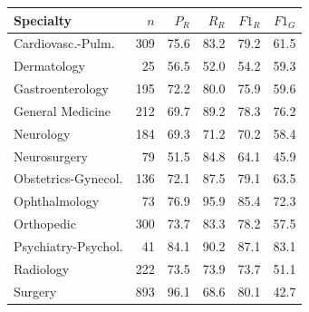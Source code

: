 \begin{tabular}{@{}lrrrrr@{}}
\toprule
Specialty & $n$ & $P_R$ & $R_R$ & $F1_R$ & $F1_G$ \\
\midrule
Cardiovasc.-Pulm. & 309 & 75.6 & 83.2 & 79.2 & 61.5 \\
Dermatology & 25 & 56.5 & 52.0 & 54.2 & 59.3 \\
Gastroenterology & 195 & 72.2 & 80.0 & 75.9 & 59.6 \\
General Medicine & 212 & 69.7 & 89.2 & 78.3 & 76.2 \\
Neurology & 184 & 69.3 & 71.2 & 70.2 & 58.4 \\
Neurosurgery & 79 & 51.5 & 84.8 & 64.1 & 45.9 \\
Obstetrics-Gynecol. & 136 & 72.1 & 87.5 & 79.1 & 63.5 \\
Ophthalmology & 73 & 76.9 & 95.9 & 85.4 & 72.3 \\
Orthopedic & 300 & 73.7 & 83.3 & 78.2 & 57.5 \\
Psychiatry-Psychol. & 41 & 84.1 & 90.2 & 87.1 & 83.1 \\
Radiology & 222 & 73.5 & 73.9 & 73.7 & 51.1 \\
Surgery & 893 & 96.1 & 68.6 & 80.1 & 42.7 \\
\bottomrule
\end{tabular}
